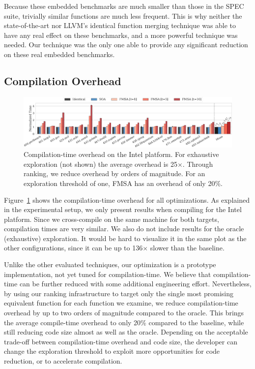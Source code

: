 Because these embedded benchmarks are much smaller than those in the SPEC suite, trivially similar functions are much less frequent.
This is why neither the state-of-the-art nor LLVM's identical function merging technique was able to have any real effect on these benchmarks, and a more powerful technique was needed.
Our technique was the only one able to provide any significant reduction on these real embedded benchmarks.

\subsection{Compilation Overhead}

\begin{figure}[t]
  \centering
  \includegraphics[width=\linewidth]{figs/compilation-time.pdf}
	\caption{Compilation-time overhead on the Intel platform. For exhaustive exploration (not shown) the average overhead is 25$\times$. Through ranking, we reduce overhead by orders of magnitude. For an exploration threshold of one, FMSA has an overhead of only 20\%.}
  \label{fig:compilation-time}
\end{figure}

Figure~\ref{fig:compilation-time} shows the compilation-time overhead for all optimizations. As explained in the experimental setup, we
only present results when compiling for the Intel platform. Since we cross-compile on the same machine for both targets, compilation times
are very similar. We also do not include results for the oracle (exhaustive) exploration. It would be hard to visualize it in the same plot
as the other configurations, since it can be up to 136$\times$ slower than the baseline.

Unlike the other evaluated techniques, our optimization is a prototype implementation, not yet tuned for compilation-time. We believe that
compilation-time can be further reduced with some additional engineering effort. Nevertheless, by using our ranking infrastructure to
target only the single most promising equivalent function for each function we examine, we reduce compilation-time overhead by up to two
orders of magnitude compared to the oracle. This brings the average compile-time overhead to only 20\% compared to the baseline, while
still reducing code size almost as well as the oracle. Depending on the acceptable trade-off between compilation-time overhead and code
size, the developer can change the exploration threshold to exploit more opportunities for code reduction, or to accelerate compilation.

